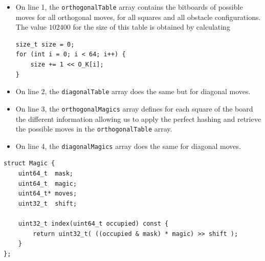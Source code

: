 \documentclass[12pt,a4paper,twoside,openright]{book}
\begin{document}
\begin{itemize}
\item On line 1, the \texttt{orthogonalTable} array contains the bitboards of possible moves for all orthogonal moves, for all squares and all obstacle configurations. The value $102400$ for the size of this table is obtained by calculating
\begin{verbatim}
size_t size = 0;
for (int i = 0; i < 64; i++) {
    size += 1 << O_K[i];
}
\end{verbatim}
\item On line 2, the \texttt{diagonalTable} array does the same but for diagonal moves.
\item On line 3, the \texttt{orthogonalMagics} array defines for each square of the board the different information allowing us to apply the perfect hashing and retrieve the possible moves in the \texttt{orthogonalTable} array.
\item On line 4, the \texttt{diagonalMagics} array does the same for diagonal moves.
\end{itemize}

\begin{mdframed}[skipabove=\baselineskip,hidealllines=true]
\begin{verbatim}
struct Magic {
    uint64_t  mask;
    uint64_t  magic;
    uint64_t* moves;
    uint32_t  shift;

    uint32_t index(uint64_t occupied) const {
        return uint32_t( ((occupied & mask) * magic) >> shift );
    }
};
\end{verbatim}
\label{lst:magic_struct}
\end{mdframed}
\end{document}
